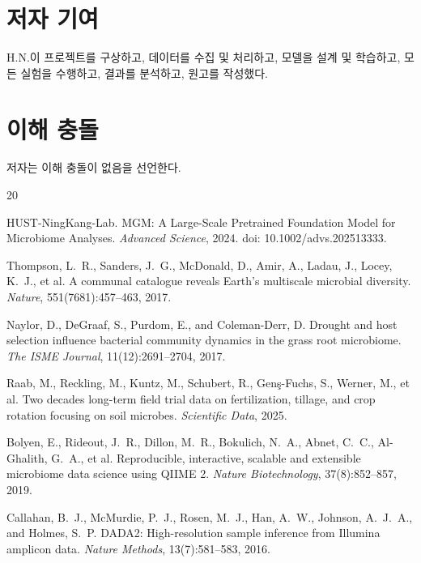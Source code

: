 \documentclass[11pt,a4paper]{article}
\begin{document}
\section*{저자 기여}

H.N.이 프로젝트를 구상하고, 데이터를 수집 및 처리하고, 모델을 설계 및 학습하고, 모든 실험을 수행하고, 결과를 분석하고, 원고를 작성했다.

\section*{이해 충돌}

저자는 이해 충돌이 없음을 선언한다.


\begin{thebibliography}{20}

HUST-NingKang-Lab.
\newblock MGM: A Large-Scale Pretrained Foundation Model for Microbiome Analyses.
\newblock \emph{Advanced Science}, 2024. doi: 10.1002/advs.202513333.

Thompson, L.~R., Sanders, J.~G., McDonald, D., Amir, A., Ladau, J., Locey, K.~J., et al.
\newblock A communal catalogue reveals Earth's multiscale microbial diversity.
\newblock \emph{Nature}, 551(7681):457--463, 2017.

Naylor, D., DeGraaf, S., Purdom, E., and Coleman-Derr, D.
\newblock Drought and host selection influence bacterial community dynamics in the grass root microbiome.
\newblock \emph{The ISME Journal}, 11(12):2691--2704, 2017.

Raab, M., Reckling, M., Kuntz, M., Schubert, R., Gen{\c{s}}-Fuchs, S., Werner, M., et al.
\newblock Two decades long-term field trial data on fertilization, tillage, and crop rotation focusing on soil microbes.
\newblock \emph{Scientific Data}, 2025.

Bolyen, E., Rideout, J.~R., Dillon, M.~R., Bokulich, N.~A., Abnet, C.~C., Al-Ghalith, G.~A., et al.
\newblock Reproducible, interactive, scalable and extensible microbiome data science using QIIME 2.
\newblock \emph{Nature Biotechnology}, 37(8):852--857, 2019.

Callahan, B.~J., McMurdie, P.~J., Rosen, M.~J., Han, A.~W., Johnson, A.~J.~A., and Holmes, S.~P.
\newblock DADA2: High-resolution sample inference from Illumina amplicon data.
\newblock \emph{Nature Methods}, 13(7):581--583, 2016.


\end{thebibliography}
\end{document}
